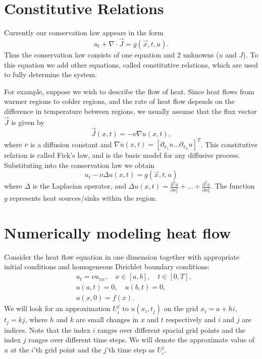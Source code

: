 \section*{Constitutive Relations}
Currently our conservation law appears in the form
\[u_t + \nabla \cdot \vec{J} = g(\vec{x},t,u).\]
Thus the conservation law consists of one equation and 2 unknowns ($u$ and $J$).
To this equation we add other equations, called constitutive relations, which are used to fully determine the system.

For example, suppose we wish to describe the flow of heat.
Since heat flows from warmer regions to colder regions, and the rate of heat flow depends on the difference in temperature between regions, we usually assume that the flux vector $\vec{J}$ is given by
\[\vec{J}(x,t) = -\nu \nabla u(x,t),\]
where $\nu$ is a diffusion constant and $\nabla u(x,t) = \left[ \partial_{x_1}u \dots \partial_{x_n}u\right]^T$.
This constitutive relation is called Fick's law, and is the basic model for any diffusive process.
Substituting into the conservation law we obtain
\[u_t -\nu \Delta u(x,t) = g(\vec{x},t,u)\]
where $\Delta$ is the Laplacian operator, and $\Delta u(x,t) = \frac{\partial ^2 u}{\partial x_1^2}+\dots+ \frac{\partial ^2 u}{\partial x_n^2}$.
The function $g$ represents heat sources/sinks within the region.

\section*{Numerically modeling heat flow}
Consider the heat flow equation in one dimension together with appropriate initial conditions and homogeneous Dirichlet boundary conditions:
\begin{align*}
	&{ } u_t = \nu u_{xx}, \quad x \in [a,b],\quad t \in [0,T], \\
	&{ } u(a,t) = 0,\quad u(b,t) = 0,\\
	&{ } u(x,0) = f(x).
\end{align*}
We will look for an approximation $U^j_i$ to $u(x_i,t_j)$ on the grid $x_i = a +  hi$, $t_j = kj$, where $h$ and $k$ are small changes in $x$ and $t$ respectively and $i$ and $j$ are indices.
Note that the index $i$ ranges over different spacial grid points and the index $j$ ranges over different time steps.
We will denote the approximate value of $u$ at the $i$'th grid point and the $j$'th time step as $U_i^j$.

